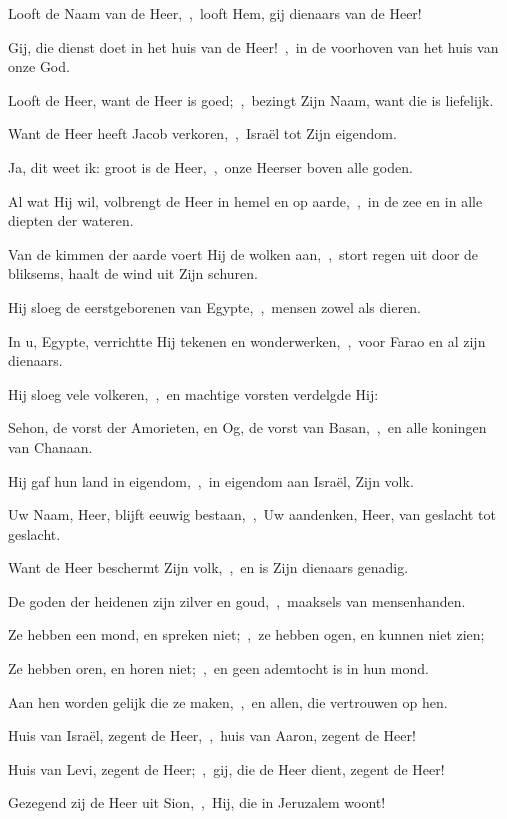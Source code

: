 \documentclass[12pt,twoside,a5paper]{article}
\begin{document}
\begin{halfparskip}
  Looft de Naam van de Heer,~\sep\ looft Hem, gij dienaars van de Heer!


  Gij, die dienst doet in het huis van de Heer!~\sep\ in de voorhoven van het huis van onze God.

  Looft de Heer, want de Heer is goed;~\sep\ bezingt Zijn Naam, want die is liefelijk.

  Want de Heer heeft Jacob verkoren,~\sep\ Israël tot Zijn eigendom.

  Ja, dit weet ik: groot is de Heer,~\sep\ onze Heerser boven alle goden.

  Al wat Hij wil, volbrengt de Heer in hemel en op aarde,~\sep\ in de zee en in alle diepten der wateren.

  Van de kimmen der aarde voert Hij de wolken aan,~\sep\ stort regen uit door de bliksems, haalt de wind uit Zijn schuren.

  Hij sloeg de eerstgeborenen van Egypte,~\sep\ mensen zowel als dieren.

  In u, Egypte, verrichtte Hij tekenen en wonderwerken,~\sep\ voor Farao en al zijn dienaars.

  Hij sloeg vele volkeren,~\sep\ en machtige vorsten verdelgde Hij:

  Sehon, de vorst der Amorieten, en Og, de vorst van Basan,~\sep\ en alle koningen van Chanaan.

  Hij gaf hun land in eigendom,~\sep\ in eigendom aan Israël, Zijn volk.

  Uw Naam, Heer, blijft eeuwig bestaan,~\sep\ Uw aandenken, Heer, van geslacht tot geslacht.

  Want de Heer beschermt Zijn volk,~\sep\ en is Zijn dienaars genadig.

  De goden der heidenen zijn zilver en goud,~\sep\ maaksels van mensenhanden.

  Ze hebben een mond, en spreken niet;~\sep\ ze hebben ogen, en kunnen niet zien;

  Ze hebben oren, en horen niet;~\sep\ en geen ademtocht is in hun mond.

  Aan hen worden gelijk die ze maken,~\sep\ en allen, die vertrouwen op hen.

  Huis van Israël, zegent de Heer,~\sep\ huis van Aaron, zegent de Heer!

  Huis van Levi, zegent de Heer;~\sep\ gij, die de Heer dient, zegent de Heer!

  Gezegend zij de Heer uit Sion,~\sep\ Hij, die in Jeruzalem woont!
\end{halfparskip}
\end{document}
